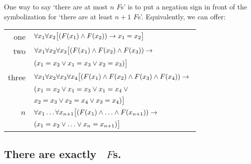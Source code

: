 One way to say `there are at most $n$ $F$s' is to put a negation sign in front of the symbolization for `there are at least $n+1$ $F$s'. Equivalently, we can offer:
\begin{tabular*}{\textwidth}{rl}
one & $\forall x_1\forall x_2\bigl[(\mathord{F}(x_1) \wedge \mathord{F}(x_2)) \rightarrow x_1=x_2\bigr]$\\
two & $\forall x_1\forall x_2\forall x_3\bigl[(\mathord{F}(x_1) \wedge \mathord{F}(x_2) \wedge \mathord{F}(x_3)) \rightarrow {}$\\ & $(x_1=x_2 \vee x_1=x_3 \vee x_2=x_3)\bigr]$\\
three & $\forall x_1\forall x_2\forall x_3\forall x_4\bigl[(\mathord{F}(x_1) \wedge \mathord{F}(x_2) \wedge \mathord{F}(x_3) \wedge \mathord{F}(x_4)) \rightarrow {}$\\
& $(x_1=x_2 \vee x_1=x_3 \vee x_1=x_4 \vee {}$\\
& $x_2=x_3 \vee x_2=x_4 \vee x_3=x_4)\bigr]$\\
$n$ & $\forall x_1\ldots\forall x_{n+1}
\bigl[(\mathord{F}(x_1) \wedge \ldots \wedge \mathord{F}(x_{n+1})) \rightarrow {}$\\
& $(x_1=x_2 \vee \ldots \vee x_n=x_{n+1})\bigr]$ 
\end{tabular*}


\subsection*{There are exactly \blank\ $F$s.}
\label{summary.exactly}

